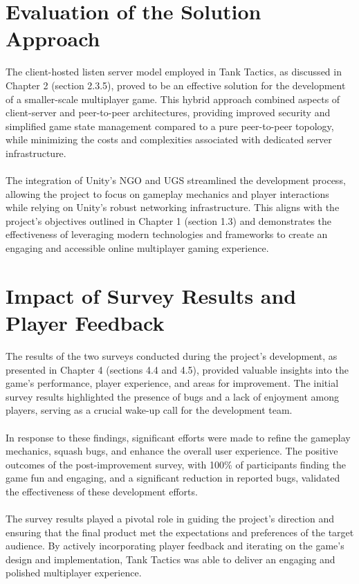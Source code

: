 \section{Evaluation of the Solution Approach}
The client-hosted listen server model employed in Tank Tactics, as discussed in Chapter 2 (section 2.3.5), proved to be an effective solution for the development of a smaller-scale multiplayer game. This hybrid approach combined aspects of client-server and peer-to-peer architectures, providing improved security and simplified game state management compared to a pure peer-to-peer topology, while minimizing the costs and complexities associated with dedicated server infrastructure.
\\
\noindent
\\
The integration of Unity's NGO and UGS streamlined the development process, allowing the project to focus on gameplay mechanics and player interactions while relying on Unity's robust networking infrastructure. This aligns with the project's objectives outlined in Chapter 1 (section 1.3) and demonstrates the effectiveness of leveraging modern technologies and frameworks to create an engaging and accessible online multiplayer gaming experience.

\section{Impact of Survey Results and Player Feedback}
The results of the two surveys conducted during the project's development, as presented in Chapter 4 (sections 4.4 and 4.5), provided valuable insights into the game's performance, player experience, and areas for improvement. The initial survey results highlighted the presence of bugs and a lack of enjoyment among players, serving as a crucial wake-up call for the development team.
\\
\noindent
\\
In response to these findings, significant efforts were made to refine the gameplay mechanics, squash bugs, and enhance the overall user experience. The positive outcomes of the post-improvement survey, with 100\% of participants finding the game fun and engaging, and a significant reduction in reported bugs, validated the effectiveness of these development efforts.
\\
\noindent
\\
The survey results played a pivotal role in guiding the project's direction and ensuring that the final product met the expectations and preferences of the target audience. By actively incorporating player feedback and iterating on the game's design and implementation, Tank Tactics was able to deliver an engaging and polished multiplayer experience.

